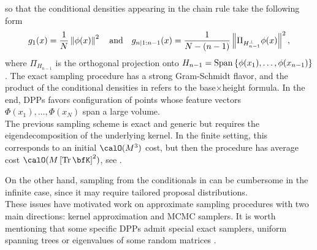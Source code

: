 \documentclass[twoside,11pt]{article}
\begin{document}
      so that the conditional densities appearing in the chain rule take the following form
      \begin{equation}
      \label{eq:conditionals_densities}
        g_1(x) 
          = \frac{1}{N} \left\| \phi(x) \right\|^2 
          \quad\text{and}\quad
        g_{n | 1:n-1}(x) 
          = \frac{1}{N-(n-1)} \left\|  \Pi_{H_{n-1}^{\perp}} \phi(x) \right\|^2,
      \end{equation}
      where $\Pi_{H_{n-1}}$ is the orthogonal projection onto 
      $H_{n-1} = \operatorname{Span}\left\{ \phi(x_1), \dots, \phi(x_{n-1})  \right\}$.
      The exact sampling procedure has a strong Gram-Schmidt flavor, and the product of the conditional densities in  refers to the base$\times$height formula.
      In the end, DPPs favors configuration of points whose feature vectors $\Phi(x_1),\dots, \Phi(x_N)$ span a large volume.\\

      The previous sampling scheme is exact and generic but requires the eigendecomposition of the underlying kernel.
      In the finite setting, this corresponds to an initial $\calO(M^3)$ cost, but then the procedure has average cost $\calO(M\lrb{\Tr \bfK}^2)$,
      see \citep{TrBaAm18}.

      On the other hand, sampling from the conditionals in  can be cumbersome in the infinite case, since it may require tailored proposal distributions.\\
      
      These issues have motivated work on approximate sampling procedures with two main directions: kernel approximation and MCMC samplers.
      It is worth mentioning that some specific DPPs admit special exact samplers, \eg uniform spanning trees \citep{PrWi98} or eigenvalues of some random matrices \citep{DuEd02}.
    
\end{document}
